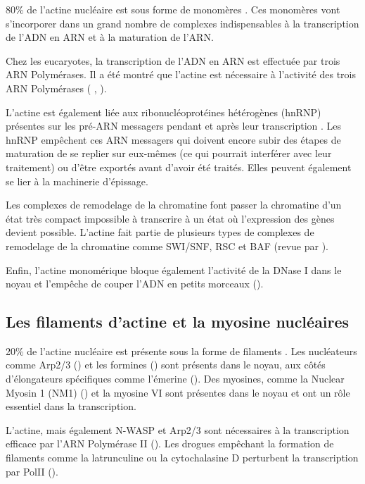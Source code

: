 \documentclass{report}
\begin{document}
80\% de l'actine nucléaire est sous forme de monomères \cite{mcdonald_nucleoplasmic_2006}. Ces monomères vont s'incorporer dans un grand nombre de complexes indispensables à la transcription de l'ADN en ARN et à la maturation de l'ARN. 

Chez les eucaryotes, la transcription de l'ADN en ARN est effectuée par trois ARN Polymérases. Il a été montré que l'actine est nécessaire à l'activité des trois ARN Polymérases ( \cite{ye_nuclear_2008}, \cite{hofmann_actin_2004} \cite{hu_role_2004}).

L'actine est également liée aux ribonucléoprotéines hétérogènes (hnRNP) présentes sur les pré-ARN messagers pendant et après leur transcription \cite{kukalev_actin_2005}. Les hnRNP empêchent ces ARN messagers qui doivent encore subir des étapes de maturation de se replier sur eux-mêmes (ce qui pourrait interférer avec leur traitement) ou d'être exportés avant d'avoir été traités. Elles peuvent également se lier à la machinerie d'épissage. 

Les complexes de remodelage de la chromatine font passer la chromatine d'un état très compact impossible à transcrire à un état où l'expression des gènes devient possible. L'actine fait partie de plusieurs types de complexes de remodelage de la chromatine comme SWI/SNF, RSC et BAF (revue par \cite{farrants_chromatin_2008}). 

Enfin, l'actine monomérique bloque également l'activité de la DNase I dans le noyau et l'empêche de couper l'ADN en petits morceaux (\cite{lazarides_actin_1974}). 

\subsection{Les filaments d'actine et la myosine nucléaires}

20\% de l'actine nucléaire est présente sous la forme de filaments \cite{mcdonald_nucleoplasmic_2006}. Les nucléateurs comme Arp2/3 (\cite{yoo_novel_2006}) et les formines (\cite{baarlink_nuclear_2013}) sont présents dans le noyau, aux côtés d'élongateurs spécifiques comme l'émerine (\cite{ho_lamin_2013}). 
Des myosines, comme la Nuclear Myosin 1 (NM1) (\cite{nowak_evidence_1997})  et la myosine VI sont présentes dans le noyau et ont un rôle essentiel dans la transcription. 

L'actine, mais également N-WASP et Arp2/3 sont nécessaires à la transcription efficace par l'ARN Polymérase II (\cite{yoo_novel_2006}). Les drogues empêchant la formation de filaments comme la latrunculine ou la cytochalasine D perturbent la transcription par PolII (\cite{mcdonald_nucleoplasmic_2006}).
\end{document}
